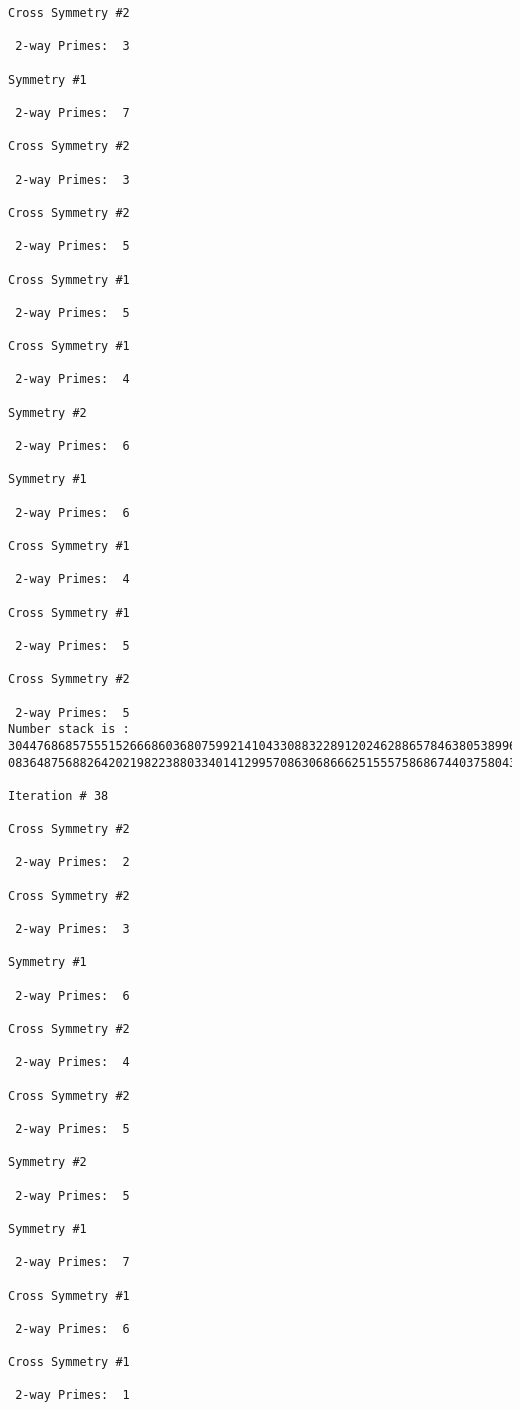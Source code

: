 {{{{\begin{verbatim}
Cross Symmetry #2

 2-way Primes: 	3

Symmetry #1

 2-way Primes: 	7

Cross Symmetry #2

 2-way Primes: 	3

Cross Symmetry #2

 2-way Primes: 	5

Cross Symmetry #1

 2-way Primes: 	5

Cross Symmetry #1

 2-way Primes: 	4

Symmetry #2

 2-way Primes: 	6

Symmetry #1

 2-way Primes: 	6

Cross Symmetry #1

 2-way Primes: 	4

Cross Symmetry #1

 2-way Primes: 	5

Cross Symmetry #2

 2-way Primes: 	5
Number stack is :
30447686857555152666860368075992141043308832289120246288657846380538996794608835958544046240163340857
08364875688264202198223880334014129957086306866625155575868674403758043361042640445859538806497699835

Iteration #	38

Cross Symmetry #2

 2-way Primes: 	2

Cross Symmetry #2

 2-way Primes: 	3

Symmetry #1

 2-way Primes: 	6

Cross Symmetry #2

 2-way Primes: 	4

Cross Symmetry #2

 2-way Primes: 	5

Symmetry #2

 2-way Primes: 	5

Symmetry #1

 2-way Primes: 	7

Cross Symmetry #1

 2-way Primes: 	6

Cross Symmetry #1

 2-way Primes: 	1


\end{verbatim}}}}}
